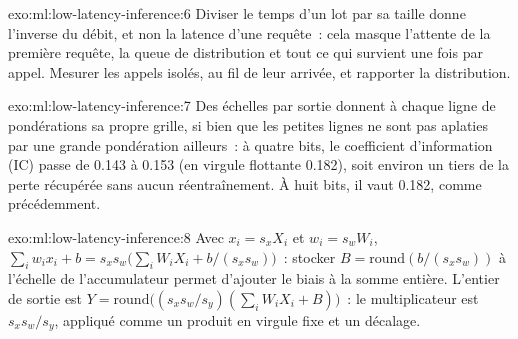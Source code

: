 \begin{solution}{exo:ml:low-latency-inference:6}
Diviser le temps d'un lot par sa taille donne l'inverse du débit, et non la latence d'une requête~: cela masque l'attente de la première
requête, la queue de distribution et tout ce qui survient une fois par appel. Mesurer les appels isolés, au fil de leur arrivée, et rapporter la distribution.
\end{solution}

\begin{solution}{exo:ml:low-latency-inference:7}
Des échelles par sortie donnent à chaque ligne de pondérations sa propre grille, si bien que les petites lignes ne sont pas aplaties par une grande pondération ailleurs~: à quatre
bits, le coefficient d'information (IC) passe de 0.143 à 0.153 (en virgule flottante 0.182), soit environ un tiers de la perte récupérée
sans aucun réentraînement. À huit bits, il vaut 0.182, comme précédemment.
\end{solution}

\begin{solution}{exo:ml:low-latency-inference:8}
Avec $x_i = s_xX_i$ et $w_i = s_wW_i$, $\sum_iw_ix_i + b = s_xs_w\big(\sum_iW_iX_i + b/(s_xs_w)\big)$~: stocker $B =
\mathrm{round}(b/(s_xs_w))$ à l'échelle de l'accumulateur permet d'ajouter le biais à la somme entière. L'entier de sortie est
$Y = \mathrm{round}\big((s_xs_w/s_y)(\sum_iW_iX_i + B)\big)$~: le multiplicateur est $s_xs_w/s_y$, appliqué comme un produit en virgule fixe
et un décalage.
\end{solution}

